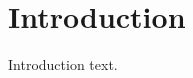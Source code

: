 \ifx\mainfile\undefined

\setcounter{chapter}{0} %
\fi

\cleardoublepage
\chapter{Introduction}
\label{chap:intro}

Introduction text.

\ifx\mainfile\undefined

\fi
